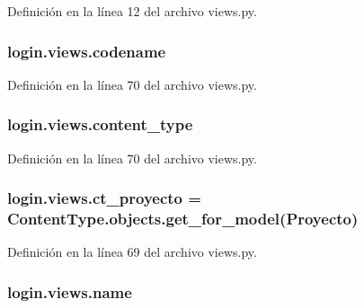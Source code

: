 Definición en la línea 12 del archivo views.\+py.

\subsubsection[{\texorpdfstring{codename}{codename}}]{\setlength{\rightskip}{0pt plus 5cm}login.\+views.\+codename}\hypertarget{namespacelogin_1_1views_aead93f923e331e0e7fc64aa3d6847cc6}{}\label{namespacelogin_1_1views_aead93f923e331e0e7fc64aa3d6847cc6}


Definición en la línea 70 del archivo views.\+py.

\subsubsection[{\texorpdfstring{content\+\_\+type}{content_type}}]{\setlength{\rightskip}{0pt plus 5cm}login.\+views.\+content\+\_\+type}\hypertarget{namespacelogin_1_1views_a7bb6fd14fbead19f97d7ba9c9665fef2}{}\label{namespacelogin_1_1views_a7bb6fd14fbead19f97d7ba9c9665fef2}


Definición en la línea 70 del archivo views.\+py.

\subsubsection[{\texorpdfstring{ct\+\_\+proyecto}{ct_proyecto}}]{\setlength{\rightskip}{0pt plus 5cm}login.\+views.\+ct\+\_\+proyecto = Content\+Type.\+objects.\+get\+\_\+for\+\_\+model({\bf Proyecto})}\hypertarget{namespacelogin_1_1views_aa576a84ccb04a71c098abd2d73c13426}{}\label{namespacelogin_1_1views_aa576a84ccb04a71c098abd2d73c13426}


Definición en la línea 69 del archivo views.\+py.

\subsubsection[{\texorpdfstring{name}{name}}]{\setlength{\rightskip}{0pt plus 5cm}login.\+views.\+name}\hypertarget{namespacelogin_1_1views_ab24adc98866e72de9e5f2b9ad4839479}{}\label{namespacelogin_1_1views_ab24adc98866e72de9e5f2b9ad4839479}


